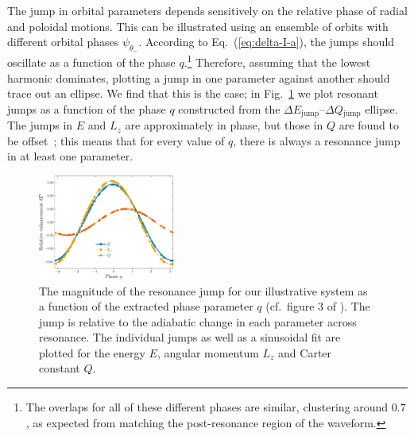 \documentclass[aps,prd,amsfonts,amssymb,amsmath,nofootinbib,showpacs,superscriptaddress,twocolumn,floatfix]{revtex4-1}
\newcommand{\eqnref}[1]{Eq.~(\ref{eq:#1})}
\newcommand{\figref}[1]{Fig.~\ref{fig:#1}}
\newcommand{\sub}[1]{\ensuremath{_\mathrm{#1}}}
\begin{document}
The jump in orbital parameters depends sensitively on the relative phase of radial and poloidal motions. This can be illustrated using an ensemble of orbits with different orbital phases $\psi_{\theta_-}$. According to \eqnref{delta-I-a}, the jumps should oscillate as a function of the phase $q$.\footnote{The overlaps for all of these different phases are similar, clustering around $0.7$, as expected from matching the post-resonance region of the waveform.} Therefore, assuming that the lowest harmonic dominates, plotting a jump in one parameter against another should trace out an ellipse. We find that this is the case; in \figref{resjump-vs-q} we plot resonant jumps as a function of the phase $q$ constructed from the $\Delta E\sub{jump}$--$\Delta Q\sub{jump}$ ellipse. The jumps in $E$ and $L_z$ are approximately in phase, but those in $Q$ are found to be offset~\cite{Flanagan2012a}; this means that for every value of $q$, there is always a resonance jump in at least one parameter.

\begin{figure}
\centering
\includegraphics[width=0.4\textwidth]{Fig_q_jump}
\caption{\label{fig:resjump-vs-q}The magnitude of the resonance jump for our illustrative system as a function of the extracted phase parameter $q$ (cf.\ figure 3 of \cite{Flanagan2012a}). The jump is relative to the adiabatic change in each parameter across resonance. The individual jumps as well as a sinusoidal fit are plotted for the energy $E$, angular momentum $L_z$ and Carter constant $Q$.}
\end{figure}

\end{document}
